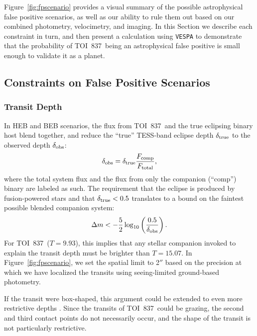 \documentclass[12pt,twocolumn,tighten]{aastex63}
\newcommand{\tn}{TOI~837} %
\begin{document}
Figure~\ref{fig:fpscenario} provides a visual summary of the possible
astrophysical false positive scenarios, as well as our ability to rule
them out based on our combined photometry, velocimetry, and imaging.
In this Section we describe each constraint in turn, and then present
a calculation using \texttt{VESPA} \citep{morton_efficient_2012} to
demonstrate that the probability of \tn\ being an astrophysical false
positive is small enough to validate it as a planet.



\subsection{Constraints on False Positive Scenarios}
\label{subsec:fp_constraints}

\subsubsection{Transit Depth}
In HEB and BEB scenarios, the flux from \tn\ and the true eclipsing
binary host blend together, and reduce the ``true'' TESS-band eclipse
depth $\delta_{\rm true}$ to the observed depth $\delta_{\rm obs}$:
\begin{equation}
  \delta_{\rm obs}
  = 
  \delta_{\rm true} \frac{F_{\rm comp}}{F_{\rm total}},
\end{equation}
where the total system flux and the flux from only the companion
(``comp'') binary are labeled as such.  The requirement that the
eclipse is produced by fusion-powered stars and that $\delta_{\rm true} < 0.5$
translates to a bound on the faintest possible blended companion
system:
\begin{equation}
  \Delta m < -\frac{5}{2} \log_{10}
             \left( \frac{0.5}{\delta_{\rm obs}} \right).
\end{equation}
For \tn\ ($T=9.93$), this implies that any stellar companion invoked
to explain the transit depth must be brighter than $T=15.07$.  In
Figure~\ref{fig:fpscenario}, we set the spatial limit to 2$''$ based
on the precision at which we have localized the transits using
seeing-limited ground-based photometry.

If the transit were box-shaped, this argument could be extended to
even more restrictive depths \citep[{\it
e.g.},][]{seager_unique_2003,vanderburg_hr858_2019,rizzuto_tess_2020}.
Since the transits of \tn\ could be grazing, the second and third
contact points do not necessarily occur, and the shape of the transit
is not particularly restrictive.
\end{document}
